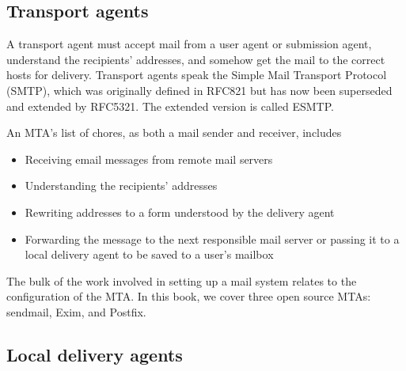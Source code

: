 \hypertarget{part0026_split_004.htmlux5cux23_idContainer1247}{}
\hypertarget{part0026_split_004.htmlux5cux23calibre_pb_3}{%
\subsection[Transport
agents]{\texorpdfstring{\protect\hypertarget{part0026_split_004.htmlux5cux23_idTextAnchor1006}{}{}Transport
agents}{Transport agents}}\label{part0026_split_004.htmlux5cux23calibre_pb_3}}

\protect\hypertarget{part0026_split_004.htmlux5cux23_idIndexMarker2406}{}{}\protect\hypertarget{part0026_split_004.htmlux5cux23_idIndexMarker2407}{}{}\protect\hypertarget{part0026_split_004.htmlux5cux23_idIndexMarker2408}{}{}A
transport agent must accept mail from a user agent or submission agent,
understand the recipients' addresses, and somehow get the mail to the
correct hosts for delivery. Transport agents speak the Simple Mail
Transport Protocol (SMTP), which was originally defined in RFC821 but
has now been superseded and extended by RFC5321. The extended version is
called
\protect\hypertarget{part0026_split_004.htmlux5cux23_idIndexMarker2409}{}{}ESMTP.

An MTA's list of chores, as both a mail sender and receiver, includes

\begin{itemize}
\tightlist
\item
  Receiving email messages from remote mail servers
\item
  Understanding the recipients' addresses
\item
  Rewriting addresses to a form understood by the delivery agent
\item
  Forwarding the message to the next responsible mail server or passing
  it to a local delivery agent to be saved to a user's mailbox
\end{itemize}

The bulk of the work involved in setting up a mail system relates to the
configuration of the MTA. In this book, we cover three open source MTAs:
{sendmail}, Exim, and Postfix.

\protect\hypertarget{part0026_split_005.html}{}{}

\hypertarget{part0026_split_005.htmlux5cux23_idContainer1247}{}
\hypertarget{part0026_split_005.htmlux5cux23calibre_pb_4}{%
\subsection[Local delivery
agents]{\texorpdfstring{\protect\hypertarget{part0026_split_005.htmlux5cux23_idTextAnchor1007}{}{}Local
delivery
agents}{Local delivery agents}}\label{part0026_split_005.htmlux5cux23calibre_pb_4}}

